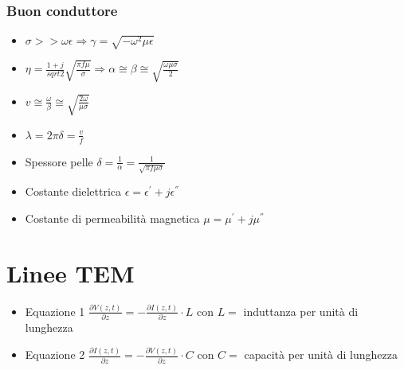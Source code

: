 \documentclass{article}
\begin{document}
\subsubsection{Buon conduttore}
\begin{itemize}
	\item \( \sigma >> \omega \epsilon \Rightarrow \gamma = \sqrt{-\omega^2 \mu \epsilon} \)
	\item \( \eta = \frac{1+j}{sqrt{2}} \sqrt{\frac{\pi f \mu}{\sigma}} \Rightarrow \alpha \cong \beta
	\cong \sqrt{\frac{\omega \mu \sigma}{2}} \)
	\item \( v \cong \frac{\omega}{\beta} \cong \sqrt{\frac{2 \omega}{\mu \sigma}} \)
	\item \( \lambda = 2 \pi \delta = \frac{v}{f} \)
	\item Spessore pelle \( \delta = \frac{1}{\alpha} = \frac{1}{\sqrt{\pi f \mu \sigma}} \)
	\item Costante dielettrica \( \epsilon = \epsilon ^ { ' } + j \epsilon ^ { '' } \)
	\item Costante di permeabilità magnetica \( \mu = \mu ^ { ' } + j \mu ^ { '' } \)
\end{itemize}

\section{Linee TEM}
\begin{itemize}
	\item Equazione 1 \( \frac{\partial V(z, t)}{\partial z} = - \frac{\partial I(z, t)}{\partial z} \cdot L\) con \(L = \) induttanza per unità di lunghezza
	\item Equazione 2 \( \frac{\partial I(z, t)}{\partial z} = - \frac{\partial V(z, t)}{\partial z} \cdot C\) con \(C = \) capacità per unità di lunghezza
\end{itemize}
\end{document}
